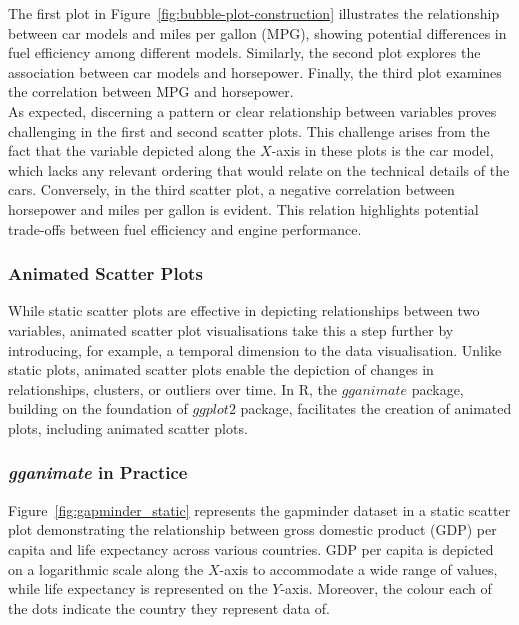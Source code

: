 \documentclass{article}\usepackage[]{graphicx}\usepackage[]{xcolor}
\numberwithin{equation}{section}
\begin{document}
\noindent The first plot in Figure~\ref{fig:bubble-plot-construction} illustrates the relationship between car models and miles per gallon (MPG), showing potential differences in fuel efficiency among different models. Similarly, the second plot explores the association between car models and horsepower. Finally, the third plot examines the correlation between MPG and horsepower. \\

\noindent As expected, discerning a pattern or clear relationship between variables proves challenging in the first and second scatter plots. This challenge arises from the fact that the variable depicted along the $X$-axis in these plots is the car model, which lacks any relevant ordering that would relate on the technical details of the cars. Conversely, in the third scatter plot, a negative correlation between horsepower and miles per gallon is evident. This relation highlights potential trade-offs between fuel efficiency and engine performance. 

\subsubsection{Animated Scatter Plots}
\noindent While static scatter plots are effective in depicting relationships between two variables, animated scatter plot visualisations take this a step further by introducing, for example, a temporal dimension to the data visualisation. Unlike static plots, animated scatter plots enable the depiction of changes in relationships, clusters, or outliers over time. In R, the $gganimate$ package, building on the foundation of $ggplot2$ package, facilitates the creation of animated plots, including animated scatter plots. 

\subsubsection{\textit{gganimate} in Practice}

\noindent Figure~\ref{fig:gapminder_static} represents the gapminder dataset in a static scatter plot demonstrating the relationship between gross domestic product (GDP) per capita and life expectancy across various countries. GDP per capita is depicted on a logarithmic scale along the $X$-axis to accommodate a wide range of values, while life expectancy is represented on the $Y$-axis. Moreover, the colour each of the dots indicate the country they represent data of.\\
\end{document}
